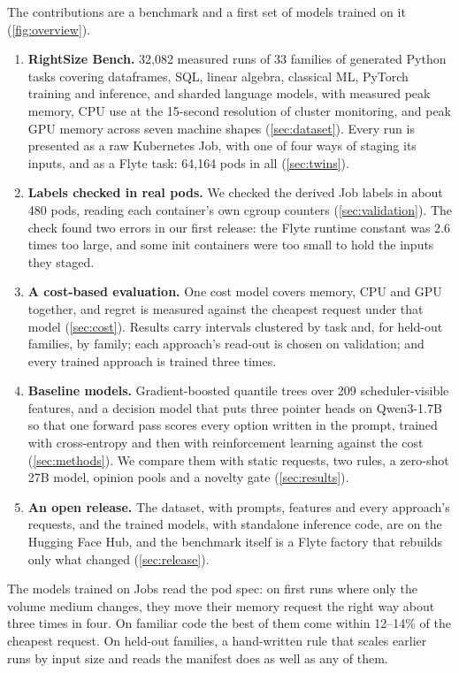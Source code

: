 The contributions are a benchmark and a first set of models trained on it (\cref{fig:overview}).
\begin{enumerate}
  \item \textbf{RightSize Bench.} 32,082 measured runs of 33 families of generated Python tasks covering
  dataframes, SQL, linear algebra, classical ML, PyTorch training and inference, and sharded language models,
  with measured peak memory, CPU use at the 15-second resolution of cluster monitoring, and peak GPU memory
  across seven machine shapes (\cref{sec:dataset}). Every run is presented as a raw Kubernetes Job, with one
  of four ways of staging its inputs, and as a Flyte task: 64,164 pods in all (\cref{sec:twins}).
  \item \textbf{Labels checked in real pods.} We checked the derived Job labels in about 480 pods, reading
  each container's own cgroup counters (\cref{sec:validation}). The check found two errors in our first
  release: the Flyte runtime constant was 2.6 times too large, and some init containers were too small to
  hold the inputs they staged.
  \item \textbf{A cost-based evaluation.} One cost model covers memory, CPU and GPU together, and regret is
  measured against the cheapest request under that model (\cref{sec:cost}). Results carry intervals
  clustered by task and, for held-out families, by family; each approach's read-out is chosen on
  validation; and every trained approach is trained three times.
  \item \textbf{Baseline models.} Gradient-boosted quantile trees over 209 scheduler-visible features, and a
  decision model that puts three pointer heads on Qwen3-1.7B so that one forward pass scores every option
  written in the prompt, trained with cross-entropy and then with reinforcement learning against the cost
  (\cref{sec:methods}). We compare them with static requests, two rules, a zero-shot 27B model, opinion
  pools and a novelty gate (\cref{sec:results}).
  \item \textbf{An open release.} The dataset, with prompts, features and every approach's requests, and the
  trained models, with standalone inference code, are on the Hugging Face Hub, and the benchmark itself is a
  Flyte factory that rebuilds only what changed (\cref{sec:release}).
\end{enumerate}

The models trained on Jobs read the pod spec: on first runs where only the volume medium changes, they move
their memory request the right way about three times in four. On familiar code the best of them come within
12--14\% of the cheapest request. On held-out families, a hand-written rule that scales earlier runs by
input size and reads the manifest does as well as any of them.
